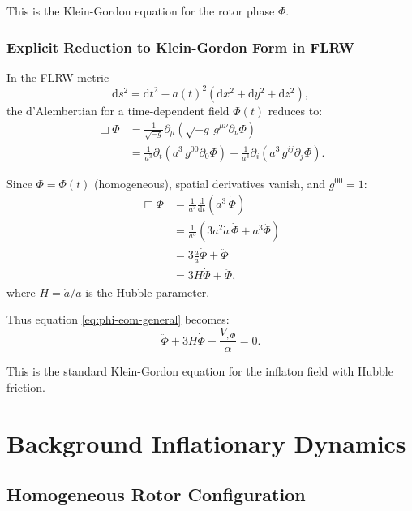 \documentclass[11pt,a4paper]{article}
\numberwithin{equation}{section}
\theoremstyle{plain}
\theoremstyle{definition}
\theoremstyle{remark}
\newcommand{\dd}{\mathrm{d}}
\begin{document}
This is the Klein-Gordon equation for the rotor phase $\Phi$.

\subsubsection{Explicit Reduction to Klein-Gordon Form in FLRW}

In the FLRW metric
\begin{equation}
\dd s^2 = \dd t^2 - a(t)^2\left(\dd x^2 + \dd y^2 + \dd z^2\right),
\end{equation}
the d'Alembertian for a time-dependent field $\Phi(t)$ reduces to:
\begin{align}
\Box\Phi &= \frac{1}{\sqrt{-g}}\partial_\mu\left(\sqrt{-g}\,g^{\mu\nu}\partial_\nu\Phi\right)\\
&= \frac{1}{a^3}\partial_t\left(a^3\,g^{00}\partial_0\Phi\right) + \frac{1}{a^3}\partial_i\left(a^3\,g^{ij}\partial_j\Phi\right).
\end{align}

Since $\Phi = \Phi(t)$ (homogeneous), spatial derivatives vanish, and $g^{00} = 1$:
\begin{align}
\Box\Phi &= \frac{1}{a^3}\frac{\dd}{\dd t}\left(a^3\,\dot{\Phi}\right)\\
&= \frac{1}{a^3}\left(3a^2\dot{a}\,\dot{\Phi} + a^3\ddot{\Phi}\right)\\
&= 3\frac{\dot{a}}{a}\dot{\Phi} + \ddot{\Phi}\\
&= 3H\dot{\Phi} + \ddot{\Phi},
\end{align}
where $H = \dot{a}/a$ is the Hubble parameter.

Thus equation \eqref{eq:phi-eom-general} becomes:
\begin{equation}
\ddot{\Phi} + 3H\dot{\Phi} + \frac{V_{,\Phi}}{\alpha} = 0.
\label{eq:phi-klein-gordon}
\end{equation}

This is the standard Klein-Gordon equation for the inflaton field with Hubble friction.

\section{Background Inflationary Dynamics}
\label{sec:background}

\subsection{Homogeneous Rotor Configuration}
\end{document}
